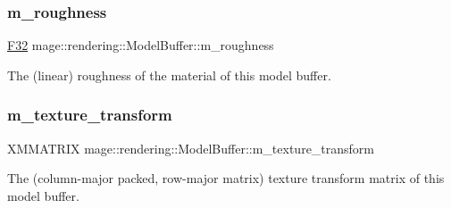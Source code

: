 \subsubsection{\texorpdfstring{m\+\_\+roughness}{m\_roughness}}
{\footnotesize\ttfamily \hyperlink{namespacemage_aa97e833b45f06d60a0a9c4fc22ae02c0}{F32} mage\+::rendering\+::\+Model\+Buffer\+::m\+\_\+roughness}

The (linear) roughness of the material of this model buffer. \hypertarget{structmage_1_1rendering_1_1_model_buffer_a89ae6a1222a84b0f166f5e46b35411b6}{}\label{structmage_1_1rendering_1_1_model_buffer_a89ae6a1222a84b0f166f5e46b35411b6} 
\subsubsection{\texorpdfstring{m\+\_\+texture\+\_\+transform}{m\_texture\_transform}}
{\footnotesize\ttfamily X\+M\+M\+A\+T\+R\+IX mage\+::rendering\+::\+Model\+Buffer\+::m\+\_\+texture\+\_\+transform}

The (column-\/major packed, row-\/major matrix) texture transform matrix of this model buffer. 